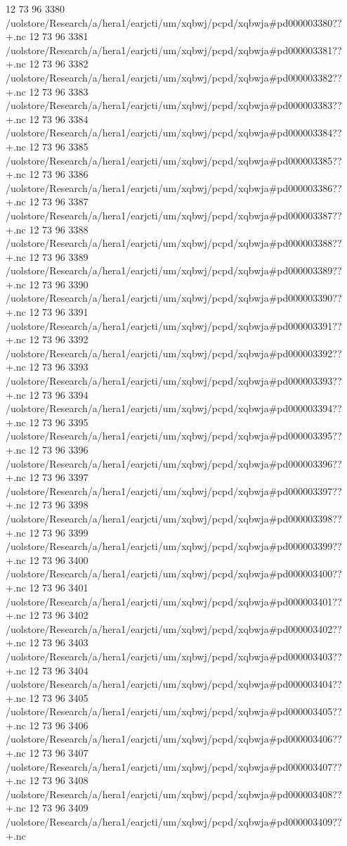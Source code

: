 12 73 96
3380
/uolstore/Research/a/hera1/earjcti/um/xqbwj/pcpd/xqbwja#pd000003380??+.nc
12 73 96
3381
/uolstore/Research/a/hera1/earjcti/um/xqbwj/pcpd/xqbwja#pd000003381??+.nc
12 73 96
3382
/uolstore/Research/a/hera1/earjcti/um/xqbwj/pcpd/xqbwja#pd000003382??+.nc
12 73 96
3383
/uolstore/Research/a/hera1/earjcti/um/xqbwj/pcpd/xqbwja#pd000003383??+.nc
12 73 96
3384
/uolstore/Research/a/hera1/earjcti/um/xqbwj/pcpd/xqbwja#pd000003384??+.nc
12 73 96
3385
/uolstore/Research/a/hera1/earjcti/um/xqbwj/pcpd/xqbwja#pd000003385??+.nc
12 73 96
3386
/uolstore/Research/a/hera1/earjcti/um/xqbwj/pcpd/xqbwja#pd000003386??+.nc
12 73 96
3387
/uolstore/Research/a/hera1/earjcti/um/xqbwj/pcpd/xqbwja#pd000003387??+.nc
12 73 96
3388
/uolstore/Research/a/hera1/earjcti/um/xqbwj/pcpd/xqbwja#pd000003388??+.nc
12 73 96
3389
/uolstore/Research/a/hera1/earjcti/um/xqbwj/pcpd/xqbwja#pd000003389??+.nc
12 73 96
3390
/uolstore/Research/a/hera1/earjcti/um/xqbwj/pcpd/xqbwja#pd000003390??+.nc
12 73 96
3391
/uolstore/Research/a/hera1/earjcti/um/xqbwj/pcpd/xqbwja#pd000003391??+.nc
12 73 96
3392
/uolstore/Research/a/hera1/earjcti/um/xqbwj/pcpd/xqbwja#pd000003392??+.nc
12 73 96
3393
/uolstore/Research/a/hera1/earjcti/um/xqbwj/pcpd/xqbwja#pd000003393??+.nc
12 73 96
3394
/uolstore/Research/a/hera1/earjcti/um/xqbwj/pcpd/xqbwja#pd000003394??+.nc
12 73 96
3395
/uolstore/Research/a/hera1/earjcti/um/xqbwj/pcpd/xqbwja#pd000003395??+.nc
12 73 96
3396
/uolstore/Research/a/hera1/earjcti/um/xqbwj/pcpd/xqbwja#pd000003396??+.nc
12 73 96
3397
/uolstore/Research/a/hera1/earjcti/um/xqbwj/pcpd/xqbwja#pd000003397??+.nc
12 73 96
3398
/uolstore/Research/a/hera1/earjcti/um/xqbwj/pcpd/xqbwja#pd000003398??+.nc
12 73 96
3399
/uolstore/Research/a/hera1/earjcti/um/xqbwj/pcpd/xqbwja#pd000003399??+.nc
12 73 96
3400
/uolstore/Research/a/hera1/earjcti/um/xqbwj/pcpd/xqbwja#pd000003400??+.nc
12 73 96
3401
/uolstore/Research/a/hera1/earjcti/um/xqbwj/pcpd/xqbwja#pd000003401??+.nc
12 73 96
3402
/uolstore/Research/a/hera1/earjcti/um/xqbwj/pcpd/xqbwja#pd000003402??+.nc
12 73 96
3403
/uolstore/Research/a/hera1/earjcti/um/xqbwj/pcpd/xqbwja#pd000003403??+.nc
12 73 96
3404
/uolstore/Research/a/hera1/earjcti/um/xqbwj/pcpd/xqbwja#pd000003404??+.nc
12 73 96
3405
/uolstore/Research/a/hera1/earjcti/um/xqbwj/pcpd/xqbwja#pd000003405??+.nc
12 73 96
3406
/uolstore/Research/a/hera1/earjcti/um/xqbwj/pcpd/xqbwja#pd000003406??+.nc
12 73 96
3407
/uolstore/Research/a/hera1/earjcti/um/xqbwj/pcpd/xqbwja#pd000003407??+.nc
12 73 96
3408
/uolstore/Research/a/hera1/earjcti/um/xqbwj/pcpd/xqbwja#pd000003408??+.nc
12 73 96
3409
/uolstore/Research/a/hera1/earjcti/um/xqbwj/pcpd/xqbwja#pd000003409??+.nc
